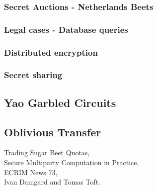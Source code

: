 \documentclass[a4paper,10pt]{article}
\begin{document}
      
      \subsubsection{Secret Auctions - Netherlands Beets} \label{BeetsAuctionApplication}
			

      \subsubsection{Legal cases - Database queries} \label{LegalDatabaseApplication}


      \subsubsection{Distributed encryption} \label{DistributedEncApplication}

      \subsubsection{Secret sharing} \label{SecretSharingApplication}

    
    \subsection{Yao Garbled Circuits} \label{Yao_Introduction}


    \subsection{Oblivious Transfer} \label{OT_Intro}




\begin{thebibliography}{5}

Trading Sugar Beet Quotas,\\
Secure Multiparty Computation in Practice,\\
ECRIM News 73,\\
Ivan Damgard and Tomas Toft.

\end{thebibliography}
\end{document}
